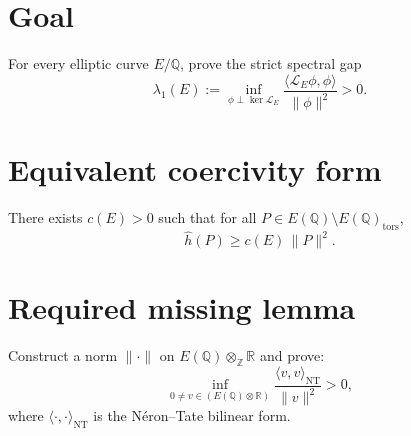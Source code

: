\section*{Goal}
For every elliptic curve $E/\mathbb{Q}$, prove the strict spectral gap
\[
\lambda_1(E):=\inf_{\phi\perp\ker\mathcal L_E}
\frac{\langle \mathcal L_E\phi,\phi\rangle}{\|\phi\|^2} > 0.
\]

\section*{Equivalent coercivity form}
There exists $c(E)>0$ such that for all $P\in E(\mathbb{Q})\setminus E(\mathbb{Q})_{\mathrm{tors}}$,
\[
\hat h(P)\ge c(E)\,\|P\|^2.
\]

\section*{Required missing lemma}
Construct a norm $\|\cdot\|$ on $E(\mathbb{Q})\otimes_{\mathbb{Z}}\mathbb{R}$ and prove:
\[
\inf_{0\neq v\in (E(\mathbb{Q})\otimes\mathbb{R})}
\frac{\langle v,v\rangle_{\mathrm{NT}}}{\|v\|^2} > 0,
\]
where $\langle\cdot,\cdot\rangle_{\mathrm{NT}}$ is the Néron--Tate bilinear form.

